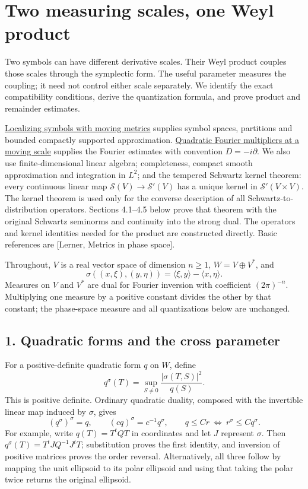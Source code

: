 \documentclass[
  11pt,
]{article}
\author{}
\date{}
\begin{document}
\section{Two measuring scales, one Weyl
product}\label{two-measuring-scales-one-weyl-product}

Two symbols can have different derivative scales. Their Weyl product
couples those scales through the symplectic form. The useful parameter
measures the coupling; it need not control either scale separately. We
identify the exact compatibility conditions, derive the quantization
formula, and prove product and remainder estimates.

\href{metric-localization.pdf}{Localizing symbols with moving metrics}
supplies symbol spaces, partitions and bounded compactly supported
approximation. \href{gauss-transform-estimates.pdf}{Quadratic Fourier
multipliers at a moving scale} supplies the Fourier estimates with
convention \(D=-i\partial\). We also use finite-dimensional linear
algebra; completeness, compact smooth approximation and integration in
\(L^2\); and the tempered Schwartz kernel theorem: every continuous
linear map \(\mathcal S(V)\to\mathcal S'(V)\) has a unique kernel in
\(\mathcal S'(V\times V)\). The kernel theorem is used only for the
converse description of all Schwartz-to-distribution operators. Sections
4.1--4.5 below prove that theorem with the original Schwartz seminorms
and continuity into the strong dual. The operators and kernel identities
needed for the product are constructed directly. Basic references are
{[}Lerner, Metrics in phase space{]}.

Throughout, \(V\) is a real vector space of dimension \(n\geq1\),
\(W=V\oplus V^*\), and \[
\sigma((x,\xi),(y,\eta))=\langle\xi,y\rangle-\langle x,\eta\rangle.
\tag{W1}
\] Measures on \(V\) and \(V^*\) are dual for Fourier inversion with
coefficient \((2\pi)^{-n}\). Multiplying one measure by a positive
constant divides the other by that constant; the phase-space measure and
all quantizations below are unchanged.

\subsection{1. Quadratic forms and the cross
parameter}\label{quadratic-forms-and-the-cross-parameter}

For a positive-definite quadratic form \(q\) on \(W\), define \[
q^\sigma(T)=\sup_{S\ne0}\frac{|\sigma(T,S)|^2}{q(S)}.
\tag{W2}
\] This is positive definite. Ordinary quadratic duality, composed with
the invertible linear map induced by \(\sigma\), gives \[
(q^\sigma)^\sigma=q,\qquad (c q)^\sigma=c^{-1}q^\sigma,
\qquad q\leq C r\ \Longleftrightarrow\ r^\sigma\leq Cq^\sigma.
\tag{W3}
\] For example, write \(q(T)=T^tQT\) in coordinates and let \(J\)
represent \(\sigma\). Then \(q^\sigma(T)=T^tJQ^{-1}J^tT\); substitution
proves the first identity, and inversion of positive matrices proves the
order reversal. Alternatively, all three follow by mapping the unit
ellipsoid to its polar ellipsoid and using that taking the polar twice
returns the original ellipsoid.
\end{document}
